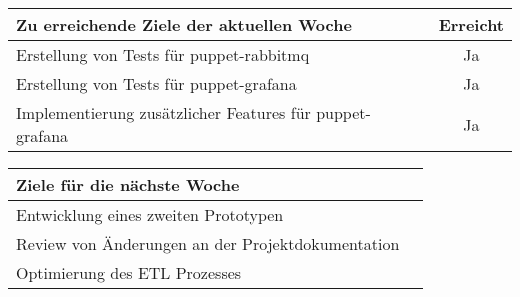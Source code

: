 \begin{tabularx}{\textwidth}{Xc}
    \arrayrulecolor{OliveGreen}
    \toprule
    {\bfseries Zu erreichende Ziele der aktuellen Woche} & {\bfseries Erreicht} \\
    \midrule[2pt]
    Erstellung von Tests für puppet-rabbitmq             &Ja                    \\
    \rowcolor{OliveGreen!15}
    Erstellung von Tests für puppet-grafana              &Ja                    \\
    \rowcolor{White}
    Implementierung zusätzlicher Features für puppet-grafana &Ja                \\
    \bottomrule[2pt]
\end{tabularx}
%
\vspace{1cm}
%
\begin{tabularx}{\textwidth}{Xc}
    \arrayrulecolor{OliveGreen}
    \toprule
    {\bfseries Ziele für die nächste Woche}              &                      \\
    \midrule[2pt]
    Entwicklung eines zweiten Prototypen                 &                      \\
    \rowcolor{OliveGreen!15}
    Review von Änderungen an der Projektdokumentation    &                      \\
    \rowcolor{White}
    Optimierung des ETL Prozesses                        &                      \\
\end{tabularx}
